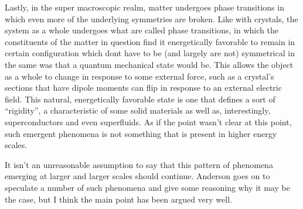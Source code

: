 Lastly, in the super macroscopic realm, matter undergoes phase transitions in which even more of the underlying symmetries are broken. Like with crystals, the system as a whole undergoes what are called phase transitions, in which the constituents of the matter in question find it energetically favorable to remain in certain configuration which dont have to be (and largely are not) symmetrical in the same was that a quantum mechanical state would be. This allows the object as a whole to change in response to some external force, such as a crystal's sections that have dipole moments can flip in response to an external electric field. This natural, energetically favorable state is one that defines a sort of ``rigidity'', a characteristic of some solid materials as well as, interestingly, superconductors and even superfluids. As if the point wasn't clear at this point, such emergent phenomena is not something that is present in higher energy scales.

It isn't an unreasonable assumption to say that this pattern of phenomena emerging at larger and larger scales should continue. Anderson goes on to speculate a number of such phenomena and give some reasoning why it may be the case, but I think the main point has been argued very well.





